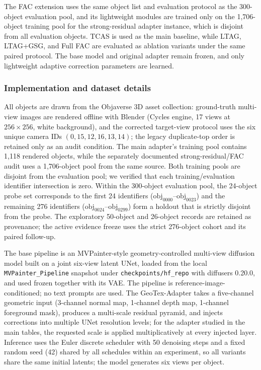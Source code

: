 \documentclass[times,twocolumn,final]{elsarticle}
\begin{document}
The FAC extension uses the same object list and evaluation protocol as the 300-object evaluation pool, and its lightweight modules are trained only on the 1,706-object training pool for the strong-residual adapter instance, which is disjoint from all evaluation objects. TCAS is used as the main baseline, while LTAG, LTAG+GSG, and Full FAC are evaluated as ablation variants under the same paired protocol. The base model and original adapter remain frozen, and only lightweight adaptive correction parameters are learned.

\subsubsection{Implementation and dataset details}

All objects are drawn from the Objaverse 3D asset collection: ground-truth multi-view images are rendered offline with Blender (Cycles engine, 17 views at $256\times256$, white background), and the corrected target-view protocol uses the six unique camera IDs $(0,15,12,16,13,14)$; the legacy duplicate-top order is retained only as an audit condition. The main adapter's training pool contains 1{,}118 rendered objects, while the separately documented strong-residual/FAC audit uses a 1{,}706-object pool from the same source. Both training pools are disjoint from the evaluation pool; we verified that each training/evaluation identifier intersection is zero. Within the 300-object evaluation pool, the 24-object probe set corresponds to the first 24 identifiers ($\mathrm{obj}_{0000}$--$\mathrm{obj}_{0023}$) and the remaining 276 identifiers ($\mathrm{obj}_{0024}$--$\mathrm{obj}_{0299}$) form a holdout that is strictly disjoint from the probe. The exploratory 50-object and 26-object records are retained as provenance; the active evidence freeze uses the strict 276-object cohort and its paired follow-up.

The base pipeline is an MVPainter-style geometry-controlled multi-view diffusion model built on a joint six-view latent UNet, loaded from the local \texttt{MVPainter\_Pipeline} snapshot under \texttt{checkpoints/hf\_repo} with diffusers 0.20.0, and used frozen together with its VAE. The pipeline is reference-image-conditioned; no text prompts are used. The GeoTex-Adapter takes a five-channel geometric input (3-channel normal map, 1-channel depth map, 1-channel foreground mask), produces a multi-scale residual pyramid, and injects corrections into multiple UNet resolution levels; for the adapter studied in the main tables, the requested scale is applied multiplicatively at every injected layer. Inference uses the Euler discrete scheduler with 50 denoising steps and a fixed random seed (42) shared by all schedules within an experiment, so all variants share the same initial latents; the model generates six views per object.
\end{document}

